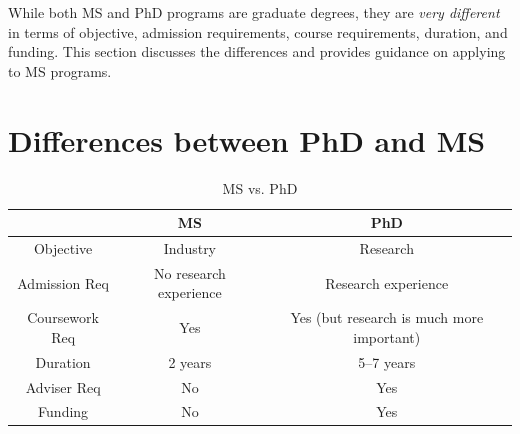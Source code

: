 \documentclass[oneside,11pt,dvipsnames]{book}
\begin{document}
While both MS and PhD programs are graduate degrees, they are \emph{very different} in terms of objective, admission requirements, course requirements, duration, and funding. This section discusses the differences and provides guidance on applying to MS programs.

\section{Differences between PhD and MS}\label{sec:phd-vs-ms}

\begin{table}
    \caption{MS vs. PhD}\label{tab:phd-vs-ms}
    \centering
    \small
    \begin{tabular}{c|c|c}
    \toprule
    \textbf{} & \textbf{MS} & \textbf{PhD} \\
    \midrule
    Objective & Industry & Research \\
    Admission Req & No research experience & Research experience \\
    Coursework Req & Yes & Yes (but research is much more important)  \\
    Duration & 2 years & 5--7 years \\
    Adviser Req & No & Yes \\
    Funding & No & Yes \\
    \bottomrule
    \end{tabular}
  \end{table}
\end{document}
